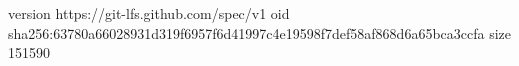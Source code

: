 version https://git-lfs.github.com/spec/v1
oid sha256:63780a66028931d319f6957f6d41997c4e19598f7def58af868d6a65bca3ccfa
size 151590
